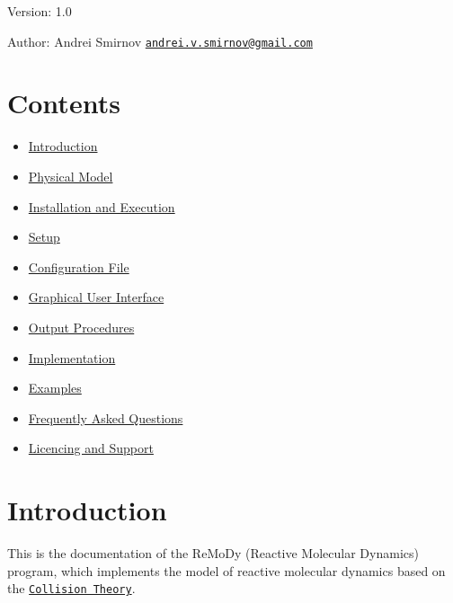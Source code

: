 \begin{Desc}
\item[Version:]1.0 \end{Desc}
\begin{Desc}
\item[Author:]Andrei Smirnov \href{mailto:andrei.v.smirnov@gmail.com}{\tt andrei.v.smirnov@gmail.com}\end{Desc}
\hypertarget{index_SecCont}{}\section{Contents}\label{index_SecCont}
\begin{itemize}
\item \hyperlink{index_SecIntro}{Introduction}\item \hyperlink{Model_SecModel}{Physical Model}\item \hyperlink{index_SecInstall}{Installation and Execution}\item \hyperlink{index_SecSetup}{Setup}\item \hyperlink{Configfile_SecConfig}{Configuration File}\item \hyperlink{GUI_SecGUI}{Graphical User Interface}\item \hyperlink{Output_SecOutput}{Output Procedures}\item \hyperlink{Implementation_SecImpl}{Implementation}\item \hyperlink{Examples_SecExamples}{Examples}\item \hyperlink{FAQ}{Frequently Asked Questions}\item \hyperlink{index_SecMisc}{Licencing and Support}\end{itemize}




 \hypertarget{index_SecIntro}{}\section{Introduction}\label{index_SecIntro}
This is the documentation of the ReMoDy (Reactive Molecular Dynamics) program, which implements the model of reactive molecular dynamics based on the \href{http://en.wikipedia.org/wiki/Collision_theory}{\tt Collision Theory}.



